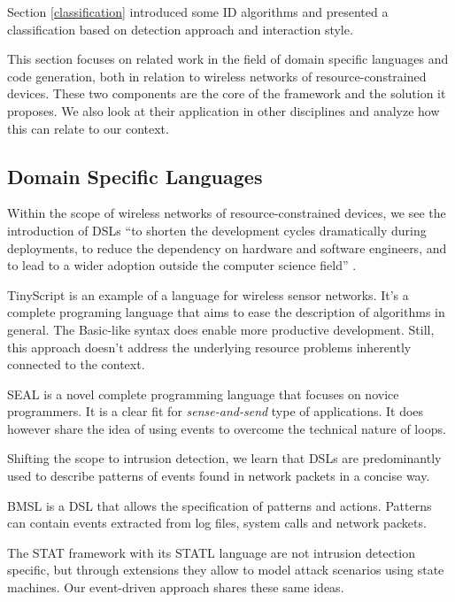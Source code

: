 \documentclass[3p,times,procedia]{elsarticle}
\begin{document}
Section \ref{classification} introduced some ID algorithms
\cite{ganeriwal2008reputation,mishra2004intrusion,krontiris2009cooperative} and
presented a classification
\cite{mishra2004intrusion,ioannis2007towards,alrajeh2013intrusion} based on
detection approach and interaction style.

This section focuses on related work in the field of domain specific languages
and code generation, both in relation to wireless networks of
resource-constrained devices. These two components are the core of the \NAME
framework and the solution it proposes. We also look at their application in
other disciplines and analyze how this can relate to our context.

\subsection{Domain Specific Languages}

Within the scope of wireless networks of resource-constrained devices, we see
the introduction of DSLs \enquote{to shorten the development cycles
dramatically during deployments, to reduce the dependency on hardware and
software engineers, and to lead to a wider adoption outside the computer
science field} \cite{sadilek2008domain}.

TinyScript \cite{levis2004tinyscript} is an example of a language for wireless
sensor networks. It's a complete programing language that aims to ease the
description of algorithms in general. The Basic-like syntax does enable more
productive development. Still, this approach doesn't address the underlying
resource problems inherently connected to the context.

SEAL \cite{elsts2013seal} is a novel complete programming language that focuses
on novice programmers. It is a clear fit for \emph{sense-and-send} type of
applications. It does however share the idea of using events to overcome the
technical nature of loops.

Shifting the scope to intrusion detection, we learn that DSLs are predominantly
used to describe patterns of events found in network
packets \cite{sekar1999high,roesch1999snort} in a concise way.

BMSL \cite{uppuluri2001experiences} is a DSL that allows the specification of
patterns and actions. Patterns can contain events extracted from log files,
system calls and network packets.

The STAT framework with its STATL language
\cite{eckmann2002statl,vigna2003designing} are not intrusion detection
specific, but through extensions they allow to model attack scenarios using
state machines. Our event-driven approach shares these same ideas.
\end{document}
